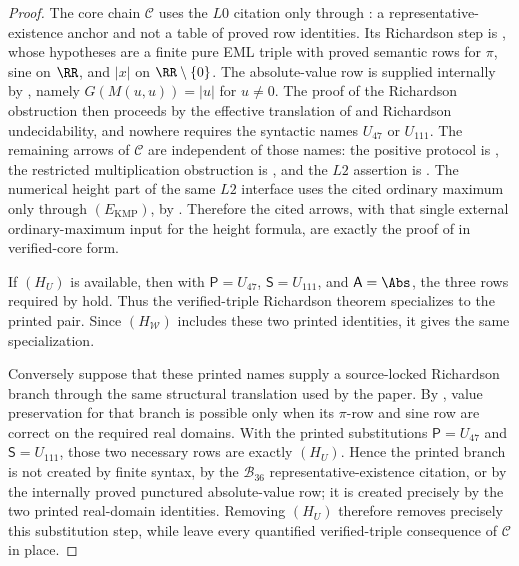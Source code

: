 \begin{proof}
The core chain \(\mathcal C\) uses the \(L0\) citation only through
: a representative-existence
anchor and not a table of proved row identities.  Its Richardson step is
, whose hypotheses
are a finite pure EML triple with proved semantic rows for \(\pi\), sine on
\(\RR\), and \(|x|\) on \(\RR\setminus\{0\}\).  The absolute-value row is supplied
internally by , namely
\(G(M(u,u))=|u|\) for \(u\ne0\).  The proof of the Richardson obstruction then
proceeds by the effective translation of  and
Richardson undecidability, and nowhere requires the syntactic names \(U_{47}\) or
\(U_{111}\).  The remaining arrows of \(\mathcal C\) are independent of those
names: the positive protocol is
, the restricted
multiplication obstruction is
, and
the \(L2\) assertion is
.  The numerical
height part of the same \(L2\) interface uses the cited ordinary maximum only
through \((E_{\mathrm{KMP}})\), by
.
Therefore the cited arrows, with that single external ordinary-maximum input for
the height formula, are exactly the proof of  in
verified-core form.

If \((H_U)\) is available, then with \(\mathsf P=U_{47}\),
\(\mathsf S=U_{111}\), and \(\mathsf A=\Abs\), the three rows required by
 hold.  Thus the verified-triple Richardson theorem
specializes to the printed pair.  Since \((H_{\mathcal W})\) includes these two
printed identities, it gives the same specialization.

Conversely suppose that these printed names supply a source-locked Richardson
branch through the same structural translation used by the paper.  By
, value preservation for that branch is
possible only when its \(\pi\)-row and sine row are correct on the required real
domains.  With the printed substitutions \(\mathsf P=U_{47}\) and
\(\mathsf S=U_{111}\), those two necessary rows are exactly \((H_U)\).  Hence the
printed branch is not created by finite syntax, by the \(\mathcal B_{36}\)
representative-existence citation, or by the internally proved punctured
absolute-value row; it is created precisely by the two printed real-domain
identities.  Removing \((H_U)\) therefore removes precisely this substitution
step, while
leave every quantified verified-triple consequence of \(\mathcal C\) in place.


\end{proof}
